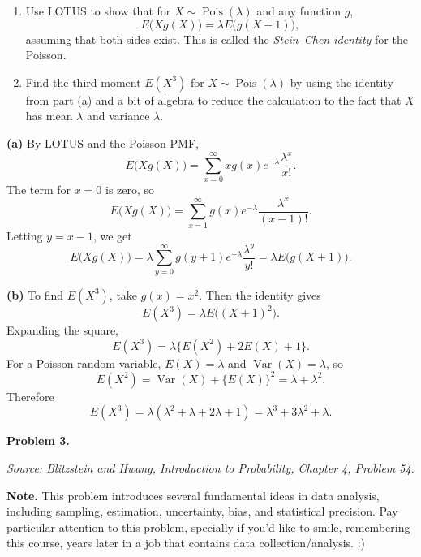 \documentclass[11pt]{article}
\newcommand{\source}[1]{%
    \vspace{0.15cm}
    {\small\textit{Source: Blitzstein and Hwang, \textit{Introduction to Probability}, Chapter 4, Problem #1.}}
}
\begin{document}
\begin{enumerate}[label=(\alph*), leftmargin=*]
    \item Use LOTUS to show that for $X\sim \operatorname{Pois}(\lambda)$ and any function $g$,
    \[
    E\bigl(Xg(X)\bigr)=\lambda E\bigl(g(X+1)\bigr),
    \]
    assuming that both sides exist. This is called the \emph{Stein--Chen identity} for the Poisson.

    \item Find the third moment $E(X^3)$ for $X\sim\operatorname{Pois}(\lambda)$ by using the identity from part (a) and a bit of algebra to reduce the calculation to the fact that $X$ has mean $\lambda$ and variance $\lambda$.
\end{enumerate}

\begin{solutionbox}
\textbf{(a)} By LOTUS and the Poisson PMF,
\[
E\bigl(Xg(X)\bigr)
=
\sum_{x=0}^{\infty}xg(x)e^{-\lambda}\frac{\lambda^x}{x!}.
\]
The term for \(x=0\) is zero, so
\[
E\bigl(Xg(X)\bigr)
=
\sum_{x=1}^{\infty}g(x)e^{-\lambda}\frac{\lambda^x}{(x-1)!}.
\]
Letting \(y=x-1\), we get
\[
E\bigl(Xg(X)\bigr)
=
\lambda\sum_{y=0}^{\infty}g(y+1)e^{-\lambda}\frac{\lambda^y}{y!}
=
\lambda E\bigl(g(X+1)\bigr).
\]


\textbf{(b)} To find \(E(X^3)\), take \(g(x)=x^2\). Then the identity gives
\[
E(X^3)=\lambda E\bigl((X+1)^2\bigr).
\]
Expanding the square,
\[
E(X^3)=\lambda\{E(X^2)+2E(X)+1\}.
\]
For a Poisson random variable, \(E(X)=\lambda\) and \(\operatorname{Var}(X)=\lambda\), so
\[
E(X^2)=\operatorname{Var}(X)+\{E(X)\}^2=\lambda+\lambda^2.
\]
Therefore
\[
E(X^3)=\lambda(\lambda^2+\lambda+2\lambda+1)
=
\lambda^3+3\lambda^2+\lambda.
\]
 
\end{solutionbox}
\newpage






\begin{problemheader}
\textbf{Problem 3.}
\end{problemheader}
\source{54}

\textbf{Note.}
This problem introduces several fundamental ideas in data analysis, including
sampling, estimation, uncertainty, bias, and statistical precision. Pay
particular attention to this problem, specially if you'd like to smile, remembering this course, years later in a job that contains data collection/analysis. :)
\end{document}
